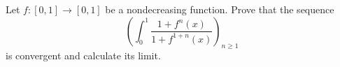 Let $ f:[0,1]\longrightarrow [0,1] $ be a nondecreasing function. Prove that the sequence
$$ \left( \int_0^1 \frac{1+f^n(x)}{1+f^{1+n} (x)} \right)_{n\ge 1} $$is convergent and calculate its limit.